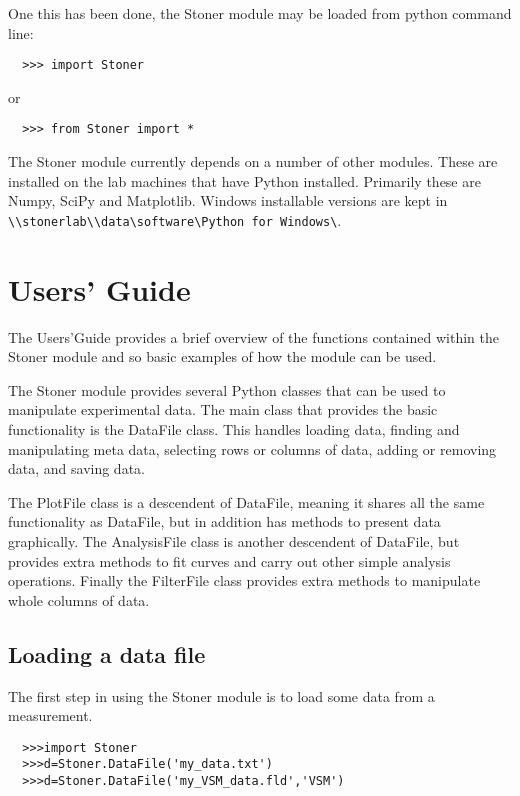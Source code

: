 \documentclass[a4paper,11pt]{scrartcl}
\begin{document}
One this has been done, the Stoner module may be loaded from python command line:

\begin{verbatim}
  >>> import Stoner
\end{verbatim}

or

\begin{verbatim}
  >>> from Stoner import *
\end{verbatim}

The Stoner module currently depends on a number of other modules. These are installed on the lab machines that have Python installed. Primarily these are Numpy, SciPy and Matplotlib. Windows installable versions are kept in \\ \verb#\\stonerlab\\data\software\Python for Windows\#.

\section{Users' Guide}

The Users'Guide provides a brief overview of the functions contained within the Stoner module and so basic examples of how the module can be used.

The Stoner module provides several Python classes that can be used to manipulate experimental data. The main class that provides the basic functionality is the DataFile class. This handles loading data, finding and manipulating meta data, selecting rows or columns of data, adding or removing data, and saving data.

The PlotFile class is a descendent of DataFile, meaning it shares all the same functionality as DataFile, but in addition has methods to present data graphically. The AnalysisFile class is another descendent of DataFile, but provides extra methods to fit curves and carry out other simple analysis operations. Finally the FilterFile class provides extra methods to manipulate whole columns of data.

\subsection{Loading a data file}

The first step in using the Stoner module is to load some data from a measurement.

\begin{verbatim}
  >>>import Stoner
  >>>d=Stoner.DataFile('my_data.txt')
  >>>d=Stoner.DataFile('my_VSM_data.fld','VSM')
\end{verbatim}
\end{document}
